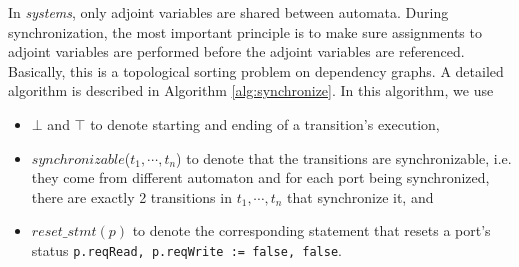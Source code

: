 In \lang{} \emph{systems}, only adjoint variables are shared between automata. During synchronization, the most important principle is to make sure assignments to adjoint variables are performed before the adjoint variables are referenced. Basically, this is a topological sorting problem on dependency graphs. A detailed algorithm is described in Algorithm \ref{alg:synchronize}. In this algorithm, we use
\begin{itemize}
    \item $\bot$ and $\top$ to denote starting and ending of a transition's execution, \item $synchronizable$($t_1,\cdots,t_n$) to denote that the transitions are synchronizable, i.e. they come from different automaton and for each port being synchronized, there are exactly 2 transitions in $t_1,\cdots,t_n$ that synchronize it, and
    \item $reset\_stmt(p)$ to denote the corresponding statement that resets a port's status \texttt{p.reqRead, p.reqWrite := false, false}.
\end{itemize}

